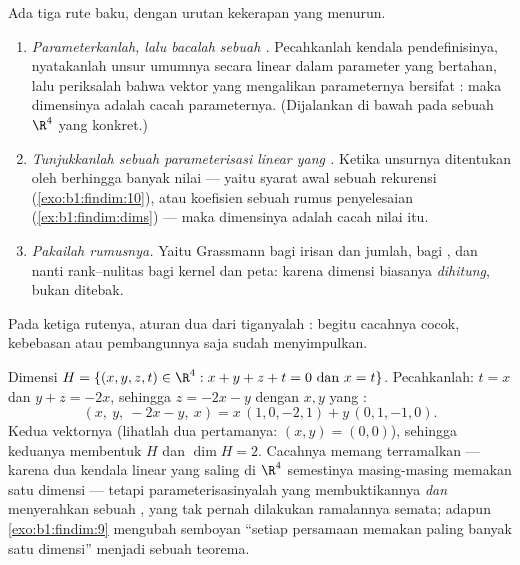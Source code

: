 \begin{method}
\label{met:b1:findim:computedim}
Ada tiga rute baku, dengan urutan kekerapan yang menurun.
\begin{enumerate}
  \item \emph{Parameterkanlah, lalu bacalah sebuah .} Pecahkanlah
        kendala pendefinisinya, nyatakanlah unsur umumnya
        secara linear dalam parameter yang bertahan, lalu periksalah bahwa
        vektor yang mengalikan parameternya bersifat : maka
        dimensinya adalah cacah parameternya. (Dijalankan di bawah pada
        sebuah  $\R^4$ yang konkret.)
  \item \emph{Tunjukkanlah sebuah parameterisasi linear yang .} Ketika
        unsurnya ditentukan oleh berhingga banyak nilai ---
        yaitu syarat awal sebuah rekurensi
        (\cref{exo:b1:findim:10}), atau koefisien sebuah rumus
        penyelesaian (\cref{ex:b1:findim:dims}) --- maka dimensinya adalah
        cacah nilai itu.
  \item \emph{Pakailah rumusnya.} Yaitu Grassmann bagi irisan dan
        jumlah,  bagi , dan nanti rank--nulitas bagi
        kernel dan peta: karena dimensi biasanya
        \emph{dihitung}, bukan ditebak.
\end{enumerate}
Pada ketiga rutenya, aturan dua dari tiganyalah :
begitu cacahnya cocok, kebebasan atau pembangunnya saja sudah menyimpulkan.
\end{method}

\begin{example}
\label{ex:b1:findim:parametrize}
Dimensi $H = \{(x, y, z, t) \in \R^4 : x + y + z + t = 0
\text{ dan } x = t\}$. Pecahkanlah: $t = x$ dan $y + z = -2x$, sehingga $z =
-2x - y$ dengan $x, y$ yang :
\[
(x,\ y,\ -2x - y,\ x) = x\,(1, 0, -2, 1) + y\,(0, 1, -1, 0) .
\]
Kedua vektornya  (lihatlah dua  pertamanya:
$(x, y) = (0,0)$), sehingga keduanya membentuk  $H$ dan $\dim H = 2$.
Cacahnya memang terramalkan --- karena dua kendala linear yang saling 
di $\R^4$ semestinya masing-masing memakan satu dimensi --- tetapi
parameterisasinyalah yang membuktikannya \emph{dan} menyerahkan sebuah , yang
tak pernah dilakukan ramalannya semata; adapun \cref{exo:b1:findim:9} mengubah
semboyan ``setiap persamaan memakan paling banyak satu dimensi'' menjadi sebuah
teorema.
\end{example}

